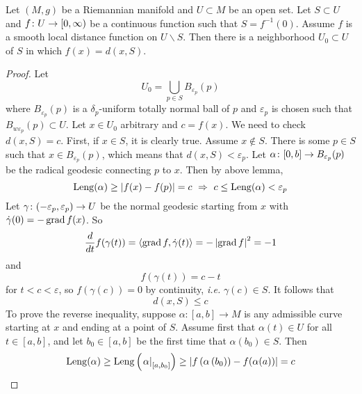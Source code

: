 \begin{enumerate}[label=\arabic{*}.]
	\begin{thm}
	    Let $(M,g)$ be a Riemannian manifold and $U \subset M$ be an open set. Let $S \subset U$ and $f \colon U \rightarrow [0,\infty)$ be a continuous function such that $S = f^{-1}(0)$. Assume $f$ is a smooth local distance function on $U \backslash S$. Then there is a neighborhood $U_0 \subset U$ of $S$ in which $f(x) = d(x,S)$.
	\end{thm}
	\begin{proof}
	    Let
	    \begin{equation*}
	        U_0 = \bigcup_{p\in S}B_{\varepsilon_p}(p)
	    \end{equation*}
	    where $B_{\varepsilon_p}(p)$ is a $\delta_p$-uniform totally normal ball of $p$ and $\varepsilon_p$ is chosen such that $B_{w\varepsilon_p}(p) \subset U$. Let $x \in U_0$ arbitrary and $c = f(x)$. We need to check $d(x,S) = c$. First, if $x \in S$, it is clearly true. Assume $x \notin S$. There is some $p \in S$ such that $x \in B_{\varepsilon_p}(p)$, which means that $d(x,S) < \varepsilon_p$. Let $\alpha \colon [0,b] \rightarrow B_{\varepsilon_p}(p)$ be the radical geodesic connecting $p$ to $x$. Then by above lemma,
	    \begin{equation*}
	        \operatorname{Leng}(\alpha) \geq \left\lvert f(x)-f(p)\right\lvert = c~\Rightarrow~c \leq \operatorname{Leng}(\alpha) < \varepsilon_p
	    \end{equation*} 
	    Let $\gamma \colon (-\varepsilon_p,\varepsilon_p) \rightarrow U$ be the normal geodesic starting from $x$ with $\dot{\gamma}(0) = -\operatorname{grad}f(x)$. So
	    \begin{equation*}
	        \frac{d}{d t} f(\gamma(t))=\left\langle \operatorname{grad} f, \dot{\gamma}(t) \right\rangle=-\left\lvert\operatorname{grad} f\right\lvert^2=-1
	    \end{equation*}
	    and
	    \begin{equation*}
	        f(\gamma(t)) = c - t
	    \end{equation*}
	    for $t < c <\varepsilon$, so $f(\gamma(c)) = 0$ by continuity, \emph{i.e.} $\gamma(c) \in S$. It follows that
	    \begin{equation*}
	        d(x,S) \leq c
	    \end{equation*} 
	    To prove the reverse inequality, suppose $\alpha:[a, b] \rightarrow M$ is any admissible curve starting at $x$ and ending at a point of $S$. Assume first that $\alpha(t) \in U$ for all $t \in[a, b]$, and let $b_0 \in[a, b]$ be the first time that $\alpha\left(b_0\right) \in S$. Then
	    \begin{equation*}
	        \op{Leng}(\alpha) \geq \op{Leng}\left(\left.\alpha\right|_{\left[a, b_0\right]}\right) \geq\left|f\left(\alpha\left(b_0\right)\right)-f(\alpha(a))\right|=c

\end{equation*}
\end{proof}
\end{enumerate}
